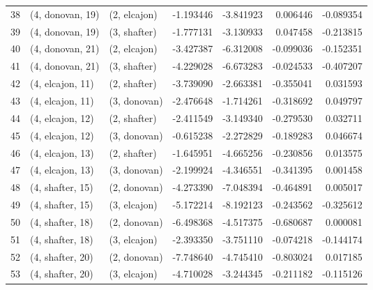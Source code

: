 \begin{tabular}{lllrrrr}
38 &  (4, donovan, 19) &     (2, elcajon) &  -1.193446 &  -3.841923 &   0.006446 & -0.089354 \\
39 &  (4, donovan, 19) &     (3, shafter) &  -1.777131 &  -3.130933 &   0.047458 & -0.213815 \\
40 &  (4, donovan, 21) &     (2, elcajon) &  -3.427387 &  -6.312008 &  -0.099036 & -0.152351 \\
41 &  (4, donovan, 21) &     (3, shafter) &  -4.229028 &  -6.673283 &  -0.024533 & -0.407207 \\
42 &  (4, elcajon, 11) &     (2, shafter) &  -3.739090 &  -2.663381 &  -0.355041 &  0.031593 \\
43 &  (4, elcajon, 11) &     (3, donovan) &  -2.476648 &  -1.714261 &  -0.318692 &  0.049797 \\
44 &  (4, elcajon, 12) &     (2, shafter) &  -2.411549 &  -3.149340 &  -0.279530 &  0.032711 \\
45 &  (4, elcajon, 12) &     (3, donovan) &  -0.615238 &  -2.272829 &  -0.189283 &  0.046674 \\
46 &  (4, elcajon, 13) &     (2, shafter) &  -1.645951 &  -4.665256 &  -0.230856 &  0.013575 \\
47 &  (4, elcajon, 13) &     (3, donovan) &  -2.199924 &  -4.346551 &  -0.341395 &  0.001458 \\
48 &  (4, shafter, 15) &     (2, donovan) &  -4.273390 &  -7.048394 &  -0.464891 &  0.005017 \\
49 &  (4, shafter, 15) &     (3, elcajon) &  -5.172214 &  -8.192123 &  -0.243562 & -0.325612 \\
50 &  (4, shafter, 18) &     (2, donovan) &  -6.498368 &  -4.517375 &  -0.680687 &  0.000081 \\
51 &  (4, shafter, 18) &     (3, elcajon) &  -2.393350 &  -3.751110 &  -0.074218 & -0.144174 \\
52 &  (4, shafter, 20) &     (2, donovan) &  -7.748640 &  -4.745410 &  -0.803024 &  0.017185 \\
53 &  (4, shafter, 20) &     (3, elcajon) &  -4.710028 &  -3.244345 &  -0.211182 & -0.115126 \\
\bottomrule
\end{tabular}
